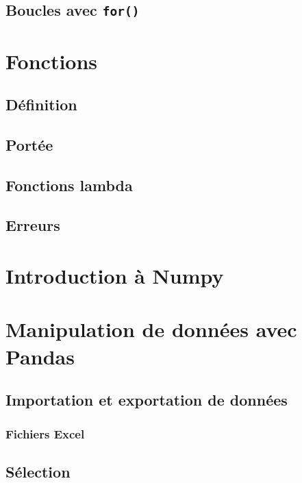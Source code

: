 \documentclass[12pt,]{book}
\numberwithin{equation}{section}
\numberwithin{countremarque}{section}
\begin{document}
\section{\texorpdfstring{Boucles avec
\texttt{for()}}{Boucles avec for()}}\label{boucles-avec-for}

\chapter{Fonctions}\label{fonctions}

\section{Définition}\label{definition}

\section{Portée}\label{portee}

\section{Fonctions lambda}\label{fonctions-lambda}

\section{Erreurs}\label{erreurs}

\chapter{Introduction à Numpy}\label{numpy}

\chapter{Manipulation de données avec Pandas}\label{pandas}

\section{Importation et exportation de
données}\label{importation-et-exportation-de-donnees}

\subsection{Fichiers Excel}\label{pandas-importation-excel}

\section{Sélection}\label{selection}
\end{document}
